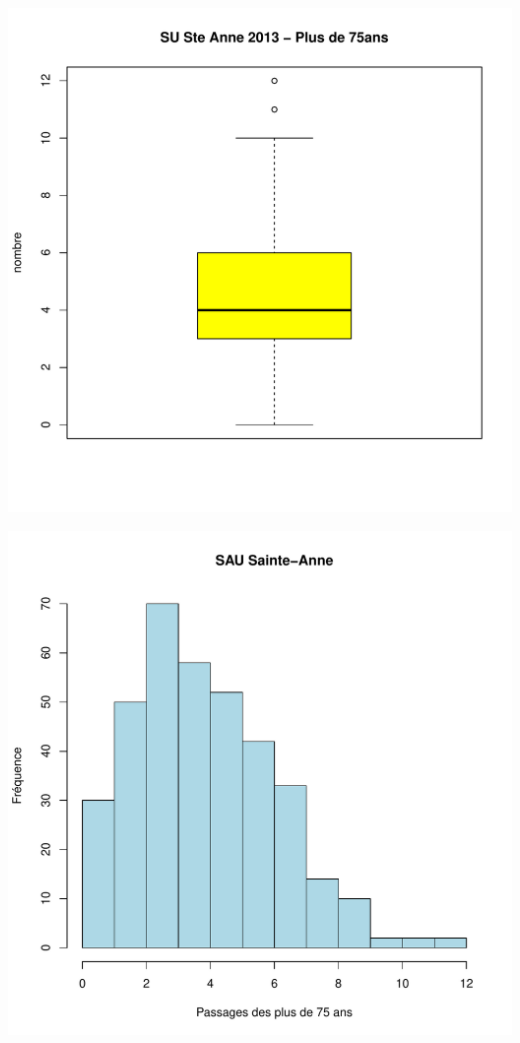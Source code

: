 \documentclass[12pt,english,french,twoside]{book}\usepackage[]{graphicx}\usepackage[]{color}
\makeatletter
\def\maxwidth{ %
  \ifdim\Gin@nat@width>\linewidth
    \linewidth
  \else
    \Gin@nat@width
  \fi
}
\makeatother
\begin{document}
\includegraphics[width=\maxwidth]{figure/stAnne_sup75_passages1} 

\includegraphics[width=\maxwidth]{figure/stAnne_sup75_passages2} 
\end{document}
